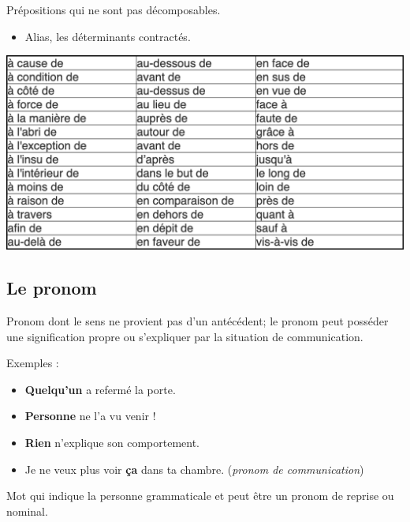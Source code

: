 \documentclass[10pt, french]{article}
\begin{document}
\begin{multicols*}{2}
\begin{definitionNOHFILLsub}
Prépositions qui ne sont pas décomposables.
\begin{itemize}
	\item	Alias, les déterminants contractés.
\end{itemize}
\begin{center}
	\includegraphics[width=0.9\columnwidth]{prep-compl}
\end{center}

\end{definitionNOHFILLsub}


\columnbreak
\subsection{Le pronom}
\begin{definitionNOHFILLsub}
Pronom dont le sens ne provient pas d'un antécédent; le pronom peut posséder une signification propre ou s'expliquer par la situation de communication.

\tcbline

Exemples :
\begin{itemize}
	\item	\textbf{Quelqu'un} a refermé la porte.
	\item	\textbf{Personne} ne l'a vu venir !
	\item	\textbf{Rien} n'explique son comportement.
	\item	Je ne veux plus voir \textbf{ça} dans ta chambre. (\textit{pronom de communication})
\end{itemize}
\end{definitionNOHFILLsub}

\begin{definitionNOHFILLsub}
Mot qui indique la personne grammaticale et peut être un pronom de reprise ou nominal.

\tcbline


\end{definitionNOHFILLsub}
\end{multicols*}
\end{document}
